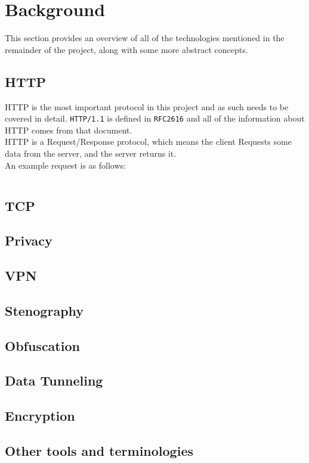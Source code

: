 \section{Background}
This section provides an overview of all of the technologies mentioned in the remainder of the project, along with some more abstract concepts.
\subsection{HTTP}
HTTP is the most important protocol in this project and as such needs to be covered in detail.
\texttt{HTTP/1.1} is defined in \texttt{RFC2616}\cite{rfc2616} and all of the information about HTTP comes from that document.\\
HTTP is a Request/Response protocol, which means the client Requests some data from the server, and the server returns it.\\
An example request is as follows:
\begin{verbatim}

\end{verbatim}

\subsection{TCP}

\subsection{Privacy}

\subsection{VPN}

\subsection{Stenography}

\subsection{Obfuscation}

\subsection{Data Tunneling}

\subsection{Encryption}

\subsection{Other tools and terminologies}


